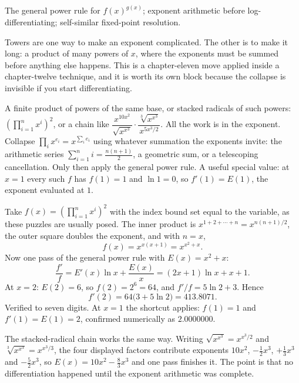\begin{seealsob}The general power rule for $f(x)^{g(x)}$; exponent arithmetic before log-differentiating; self-similar fixed-point resolution.\end{seealsob}

Towers are one way to make an exponent complicated. The other is to make it long: a product of many powers of $x$, where the exponents must be summed before anything else happens. This is a chapter-eleven move applied inside a chapter-twelve technique, and it is worth its own block because the collapse is invisible if you start differentiating.

\cue A finite product of powers of the same base, or stacked radicals of such powers: $\left(\prod_{i=1}^{n}x^{i}\right)^{2}$, or a chain like $\dfrac{x^{10x^{2}}}{\sqrt{x^{x^{3}}}}\cdot\dfrac{\sqrt[3]{x^{x^{3}}}}{x^{5x^{3}/2}}$.
\method All the work is in the exponent. Collapse $\prod_{i}x^{e_{i}}=x^{\sum_{i}e_{i}}$ using whatever summation the exponents invite: the arithmetic series $\sum_{i=1}^{n}i=\tfrac{n(n+1)}{2}$, a geometric sum, or a telescoping cancellation. Only then apply the general power rule. A useful special value: at $x=1$ every such $f$ has $f(1)=1$ and $\ln1=0$, so $f'(1)=E(1)$, the exponent evaluated at $1$.

\begin{worked}
Take $f(x)=\left(\prod_{i=1}^{n}x^{i}\right)^{2}$ with the index bound set equal to the variable, as these puzzles are usually posed. The inner product is $x^{1+2+\cdots+n}=x^{n(n+1)/2}$, the outer square doubles the exponent, and with $n=x$,
\[
f(x)=x^{x(x+1)}=x^{x^{2}+x}.
\]
Now one pass of the general power rule with $E(x)=x^{2}+x$:
\[
\frac{f'}{f}=E'(x)\ln x+\frac{E(x)}{x}=(2x+1)\ln x+x+1 .
\]
At $x=2$: $E(2)=6$, so $f(2)=2^{6}=64$, and $f'/f=5\ln2+3$. Hence
\[
f'(2)=64\bigl(3+5\ln2\bigr)=413.8071 .
\]
Verified to seven digits. At $x=1$ the shortcut applies: $f(1)=1$ and $f'(1)=E(1)=2$, confirmed numerically as $2.0000000$.

The stacked-radical chain works the same way. Writing $\sqrt{x^{x^{3}}}=x^{x^{3}/2}$ and $\sqrt[3]{x^{x^{3}}}=x^{x^{3}/3}$, the four displayed factors contribute exponents $10x^{2}$, $-\tfrac12x^{3}$, $+\tfrac13x^{3}$ and $-\tfrac52x^{3}$, so $E(x)=10x^{2}-\tfrac{8}{3}x^{3}$ and one pass finishes it. The point is that no differentiation happened until the exponent arithmetic was complete.
\end{worked}

